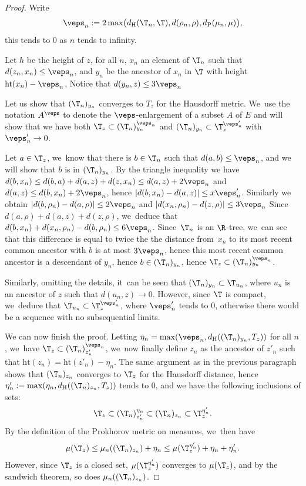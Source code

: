 \begin{proof}
Write
\[
\veps_n := 2 \max\bigl(d_{\mathrm{H}}(\T_n,\T) , d(\rho_n,\rho), d_{\mathrm{P}}(\mu_n,\mu)\bigr),
\]
this tends to $0$ as $n$ tends to infinity.

Let $h$ be the height of $z$, for all $n$, $x_n$ an element of $\T_n$ such that $d(z_n,x_n)\leq \veps_n$, and $y_n$ be the ancestor of $x_n$ in $\T$ with height $\mathrm{ht}(x_n)-\veps_n$, Notice that $d(y_n,z)\leq 3\veps_n$

Let us show that $(\T_n)_{y_n}$ converges to $T_z$ for the Hausdorff metric. We~use the notation $A^{\veps}$ to denote the $\veps$-enlargement of a subset $A$ of $E$ and will show that we have both $\T_z\subset (\T_n)_{y_n}^{\veps_n}$ and $(\T_n)_{y_n}\subset \T_z^{\veps'_n}$ with $\veps'_n\to 0$.

Let $a\in \T_z$, we~know that there is $b\in \T_n$ such that $d(a,b)\leq \veps_n$, and we will show that $b$ is in $(\T_n)_{y_n}$. By the triangle inequality we have $d(b,x_n)\leq d(b,a)+d(a,z)+d(z,x_n)\leq d(a,z)+2\veps_n$ and $d(a,z)\leq d(b,x_n)+2\veps_n$, hence $|d(b,x_n)-d(a,z)|\leq x\veps'_n$. Similarly we obtain $|d(b,\rho_n)-d(a,\rho)|\leq 2\veps_n$ and $|d(x_n,\rho_n)-d(z,\rho)|\leq 3\veps_n$ Since $d(a,\rho)+d(a,z)+d(z,\rho)$, we~deduce that $d(b,x_n)+d(x_n,\rho_n)-d(b,\rho_n)\leq 6\veps_n$. Since~$\T_n$ is an $\R$-tree, we~can see that this difference is equal to twice the the distance from~$x_n$ to its most recent common ancestor with $b$ is at most $3\veps_n$, hence this most recent common ancestor is a descendant of $y_n$, hence $b\in (\T_n)_{y_n}$, hence $\T_z\subset (\T_n)_{y_n}^{\veps_n}$.

Similarly, omitting the details, it~can be seen that $(\T_n)_{y_n}\subset \T_{u_n}$, where $u_n$ is an ancestor of $z$ such that $d(u_n,z)\to 0$. However, since $\T$ is compact, we~deduce that $\T_{u_n}\subset \T_z^{\veps'_n}$, where $\veps'_n$ tends to $0$, otherwise there would be a sequence with no subsequential limits.

We can now finish the proof. Letting $\eta_n=\max(\veps_n,d_{\mathrm{H}}((\T_n)_{y_n},T_z))$ for all $n$, we~have $\T_z\subset (\T_n)^{\veps_n}_{z'_n}$, we~now finally define $z_n$ as the ancestor of $z'_n$ such that $\mathrm{ht}(z_n)=\mathrm{ht}(z'_n)-\eta_n$. The same argument as in the previous paragraph shows that $(\T_n)_{z_n}$ converges to $\T_z$ for the Hausdorff distance, hence $\eta'_n:=\max(\eta_n,d_{\mathrm{H}}((\T_n)_{z_n},T_z))$ tends to $0$, and we have the following inclusions of sets:
\[
\T_z\subset (\T_n)_{z'_n}^{\eta_n} \subset (\T_n)_{z_n} \subset \T_z^{\eta'_n}.
\]
By the definition of the Prokhorov metric on measures, we~then have
\[
\mu(\T_z)\leq \mu_n((\T_n)_{z_n})+\eta_n\leq \mu(\T_z^{\eta'_n})+\eta_n+\eta'_n.
\]
However, since $\T_z$ is a closed set, $\mu(\T_z^{\eta'_n})$ converges to $\mu(\T_z)$, and by the sandwich theorem, so does $\mu_n((\T_n)_{z_n})$.
\end{proof}
